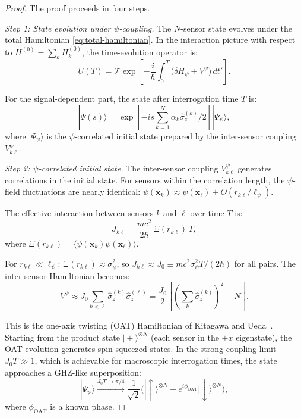 \documentclass[aps,prl,twocolumn,superscriptaddress,showpacs]{revtex4-2}
\theoremstyle{definition}
\begin{document}
\begin{proof}
The proof proceeds in four steps.

\textit{Step 1: State evolution under $\psi$-coupling.}
The $N$-sensor state evolves under the total Hamiltonian
\eqref{eq:total-hamiltonian}. In the interaction picture with respect
to $H^{(0)} = \sum_k H_k^{(0)}$, the time-evolution operator is:
\begin{equation}
U(T) = \mathcal{T}\exp\!\left[-\frac{i}{\hbar}\int_0^T
\bigl(\delta H_\psi + V^\psi\bigr)\,dt'\right].
\label{eq:time-evolution}
\end{equation}

For the signal-dependent part, the state after interrogation time $T$ is:
\begin{equation}
|\Psi(s)\rangle = \exp\!\left[-is\sum_{k=1}^N\alpha_k\hat{\sigma}_z^{(k)}/2
\right]|\Psi_\psi\rangle,
\label{eq:parameterized-state}
\end{equation}
where $|\Psi_\psi\rangle$ is the $\psi$-correlated initial state
prepared by the inter-sensor coupling $V_{k\ell}^\psi$.

\textit{Step 2: $\psi$-correlated initial state.}
The inter-sensor coupling $V_{k\ell}^\psi$ generates correlations
in the initial state. For sensors within the correlation length,
the $\psi$-field fluctuations are nearly identical:
$\psi(\mathbf{x}_k) \approx \psi(\mathbf{x}_\ell) + O(r_{k\ell}/\ell_\psi)$.

The effective interaction between sensors $k$ and $\ell$ over time $T$ is:
\begin{equation}
J_{k\ell} = \frac{mc^2}{2\hbar}\,\Xi(r_{k\ell})\,T,
\label{eq:coupling-strength}
\end{equation}
where $\Xi(r_{k\ell}) = \langle\psi(\mathbf{x}_k)\psi(\mathbf{x}_\ell)\rangle$.

For $r_{k\ell} \ll \ell_\psi$: $\Xi(r_{k\ell}) \approx \sigma_\psi^2$,
so $J_{k\ell} \approx J_0 \equiv mc^2\sigma_\psi^2 T/(2\hbar)$ for all
pairs. The inter-sensor Hamiltonian becomes:
\begin{equation}
V^\psi \approx J_0\sum_{k<\ell}\hat{\sigma}_z^{(k)}\hat{\sigma}_z^{(\ell)}
= \frac{J_0}{2}\left[\left(\sum_k\hat{\sigma}_z^{(k)}\right)^2 - N\right].
\label{eq:ising-hamiltonian}
\end{equation}

This is the one-axis twisting (OAT) Hamiltonian of Kitagawa and
Ueda~\cite{Kitagawa1993}. Starting from the product state
$|\!+\rangle^{\otimes N}$ (each sensor in the $+x$ eigenstate), the
OAT evolution generates spin-squeezed states. In the strong-coupling
limit $J_0 T \gg 1$, which is achievable for macroscopic interrogation
times, the state approaches a GHZ-like superposition:
\begin{equation}
|\Psi_\psi\rangle \xrightarrow{J_0 T \to \pi/4}
\frac{1}{\sqrt{2}}\bigl(|{\uparrow}\rangle^{\otimes N}
+ e^{i\phi_{\mathrm{OAT}}}|{\downarrow}\rangle^{\otimes N}\bigr),
\label{eq:ghz-state}
\end{equation}
where $\phi_{\mathrm{OAT}}$ is a known phase.


\end{proof}
\end{document}
